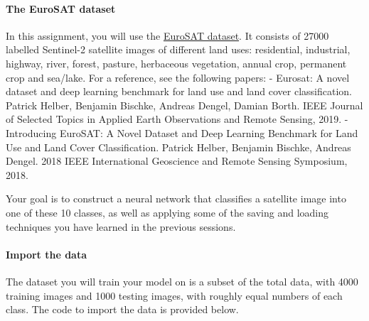 \documentclass[11pt]{article}
\begin{document}
\hypertarget{the-eurosat-dataset}{%
\paragraph{The EuroSAT dataset}\label{the-eurosat-dataset}}

In this assignment, you will use the
\href{https://github.com/phelber/EuroSAT}{EuroSAT dataset}. It consists
of 27000 labelled Sentinel-2 satellite images of different land uses:
residential, industrial, highway, river, forest, pasture, herbaceous
vegetation, annual crop, permanent crop and sea/lake. For a reference,
see the following papers: - Eurosat: A novel dataset and deep learning
benchmark for land use and land cover classification. Patrick Helber,
Benjamin Bischke, Andreas Dengel, Damian Borth. IEEE Journal of Selected
Topics in Applied Earth Observations and Remote Sensing, 2019. -
Introducing EuroSAT: A Novel Dataset and Deep Learning Benchmark for
Land Use and Land Cover Classification. Patrick Helber, Benjamin
Bischke, Andreas Dengel. 2018 IEEE International Geoscience and Remote
Sensing Symposium, 2018.

Your goal is to construct a neural network that classifies a satellite
image into one of these 10 classes, as well as applying some of the
saving and loading techniques you have learned in the previous sessions.

    \hypertarget{import-the-data}{%
\paragraph{Import the data}\label{import-the-data}}

The dataset you will train your model on is a subset of the total data,
with 4000 training images and 1000 testing images, with roughly equal
numbers of each class. The code to import the data is provided below.
\end{document}
